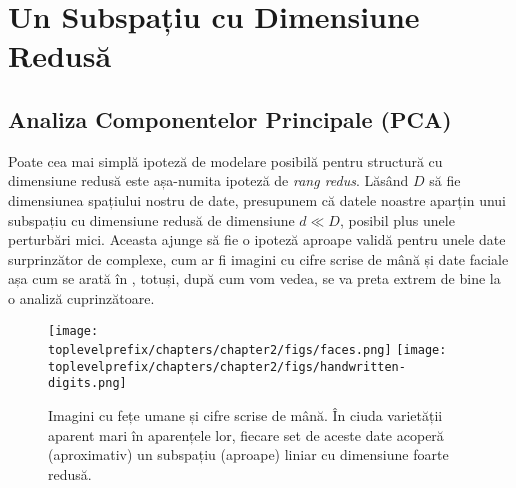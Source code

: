 \documentclass[../../book-main_ro.tex]{subfiles}
\begin{document}
\section{Un Subspațiu cu Dimensiune Redusă} \label{sec:lowrank}

\subsection{Analiza Componentelor Principale (PCA)}\label{sub:pca}

Poate cea mai simplă ipoteză de modelare posibilă pentru structură cu dimensiune redusă
este așa-numita ipoteză de \textit{rang redus}. Lăsând \(D\) să fie dimensiunea
spațiului nostru de date, presupunem că datele noastre aparțin unui subspațiu cu dimensiune redusă de dimensiune \(d \ll D\), posibil plus unele perturbări mici. Aceasta ajunge să fie o ipoteză aproape validă pentru unele date surprinzător de complexe, cum ar fi imagini cu cifre scrise de mână și date faciale \cite{BasriR2003-PAMI} așa cum se arată în , totuși, după cum vom vedea, se va preta extrem de bine la o analiză cuprinzătoare.

\begin{figure}
    \centering
    \texttt{[image: \\toplevelprefix/chapters/chapter2/figs/faces.png]}
    \hspace{5mm} \texttt{[image: \\toplevelprefix/chapters/chapter2/figs/handwritten-digits.png]}   
    \caption{Imagini cu fețe umane și cifre scrise de mână. În ciuda varietății aparent mari în aparențele lor, fiecare set de aceste date acoperă (aproximativ) un subspațiu (aproape) liniar cu dimensiune foarte redusă.}
    \label{fig:faces-digits}
\end{figure}
\end{document}
